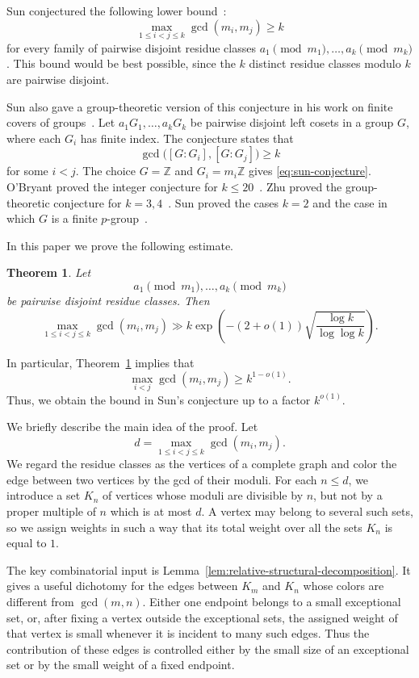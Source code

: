 \documentclass[11pt]{amsart}
\newtheorem{thm}{Theorem}[section]
\theoremstyle{remark}
\begin{document}
Sun conjectured the following lower bound~\cite{sun2006}:
\begin{equation}\label{eq:sun-conjecture}
  \max_{1\leq i<j\leq k}\gcd(m_i,m_j)\geq k
\end{equation}
for every family of pairwise disjoint residue classes
$a_1\pmod{m_1},\ldots,a_k\pmod{m_k}$.  This bound would be best possible,
since the $k$ distinct residue classes modulo $k$ are pairwise disjoint.

Sun also gave a group-theoretic version of this conjecture in his work on
finite covers of groups~\cite{sun2006}.  Let
$a_1G_1,\ldots,a_kG_k$ be pairwise disjoint left cosets in a group $G$, where
each $G_i$ has finite index.  The conjecture states that
\[
  \gcd\bigl([G:G_i],[G:G_j]\bigr)\geq k
\]
for some $i<j$.  The choice $G=\mathbb Z$ and $G_i=m_i\mathbb Z$ gives
\eqref{eq:sun-conjecture}.  O'Bryant proved the integer conjecture for
$k\leq20$~\cite{obryant2007}.  Zhu proved the group-theoretic conjecture for
$k=3,4$~\cite{zhu2008}.  Sun proved the cases $k=2$ and the case in which $G$
is a finite $p$-group~\cite{sun2006}.

In this paper we prove the following estimate.

\begin{thm}\label{thm:gcd-lower-bound}
  Let
  \[
    a_1 \pmod{m_1}, \ldots, a_k \pmod{m_k}
  \]
  be pairwise disjoint residue classes. Then
  \[
    \max_{1 \leq i < j \leq k} \gcd(m_i, m_j)
    \gg k \exp\!\left(-(2 + o(1))
      \sqrt{\frac{\log k}{\log \log k}}\right).
  \]
\end{thm}

In particular, Theorem~\ref{thm:gcd-lower-bound} implies that
\[
  \max_{i<j}\gcd(m_i,m_j)\geq k^{1-o(1)}.
\]
Thus, we obtain the bound in Sun's conjecture up to a factor $k^{o(1)}$.

We briefly describe the main idea of the proof.  Let
\[
  d=\max_{1\leq i<j\leq k}\gcd(m_i,m_j).
\]
We regard the residue classes as the vertices of a complete graph and color
the edge between two vertices by the gcd of their moduli.  For each
$n\leq d$, we introduce a set $K_n$ of vertices whose moduli are divisible by
$n$, but not by a proper multiple of $n$ which is at most $d$.  A vertex may
belong to several such sets, so we assign weights in such a way that its total
weight over all the sets $K_n$ is equal to $1$.

The key combinatorial input is
Lemma~\ref{lem:relative-structural-decomposition}.  It gives a useful
dichotomy for the edges between $K_m$ and $K_n$ whose colors are different
from $\gcd(m,n)$.  Either one endpoint belongs to a small exceptional set, or,
after fixing a vertex outside the exceptional sets, the assigned weight of
that vertex is small whenever it is incident to many such edges.  Thus the
contribution of these edges is controlled either by the small size of an
exceptional set or by the small weight of a fixed endpoint.
\end{document}
